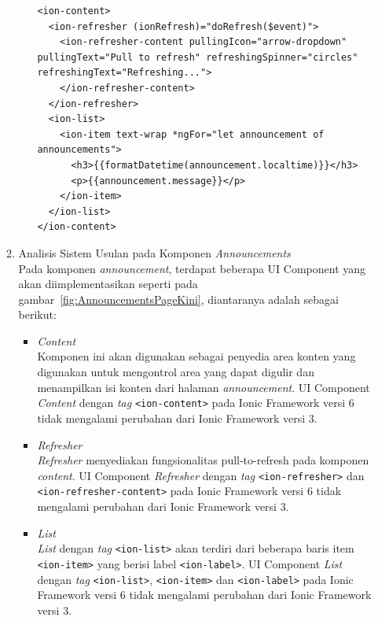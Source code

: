 \begin{enumerate}
\begin{enumerate}
\begin{itemize}
		
\begin{lstlisting}[label={lst:contentannouncement}, caption=\textit{Content} pada Halaman \textit{Annoncement}]
<ion-content>
  <ion-refresher (ionRefresh)="doRefresh($event)">
    <ion-refresher-content pullingIcon="arrow-dropdown" pullingText="Pull to refresh" refreshingSpinner="circles" refreshingText="Refreshing...">
    </ion-refresher-content>
  </ion-refresher>
  <ion-list>
    <ion-item text-wrap *ngFor="let announcement of announcements">
      <h3>{{formatDatetime(announcement.localtime)}}</h3>
      <p>{{announcement.message}}</p>
    </ion-item>
  </ion-list>
</ion-content>
\end{lstlisting} 
	\end{itemize}
	
		\item Analisis Sistem Usulan pada Komponen \textit{Announcements} \\
		Pada komponen \textit{announcement}, terdapat beberapa UI Component yang akan diimplementasikan seperti pada gambar~\ref{fig:AnnouncementsPageKini}, diantaranya adalah sebagai berikut:
	\begin{itemize}
		\item \textit{Content} \\
		Komponen ini akan digunakan sebagai penyedia area konten yang digunakan untuk mengontrol area yang dapat digulir dan menampilkan isi konten dari halaman \textit{announcement}. UI Component \textit{Content} dengan \textit{tag} \texttt{<ion-content>} pada Ionic Framework versi 6 tidak mengalami perubahan dari Ionic Framework versi 3. 
		\newpage
		\item \textit{Refresher} \\
		\textit{Refresher} menyediakan fungsionalitas  pull-to-refresh pada komponen \textit{content}. UI Component \textit{Refresher} dengan \textit{tag} \texttt{<ion-refresher>} dan \texttt{<ion-refresher-content>} pada Ionic Framework versi 6 tidak mengalami perubahan dari Ionic Framework versi 3.

		\item \textit{List} \\
		\textit{List} dengan \textit{tag} \texttt{<ion-list>} akan terdiri dari beberapa baris item \texttt{<ion-item>} yang berisi label \texttt{<ion-label>}. UI Component \textit{List} dengan \textit{tag} \texttt{<ion-list>}, \texttt{<ion-item>} dan \texttt{<ion-label>} pada Ionic Framework versi 6 tidak mengalami perubahan dari Ionic Framework versi 3.
		

\end{itemize}
\end{enumerate}
\end{enumerate}
